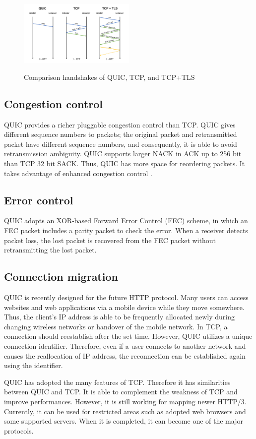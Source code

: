 \begin{figure}[!ht]
	\centering
	\includegraphics[width=0.5\textwidth]{images/fig_2_4.pdf}\\
	\caption{Comparison handshakes of QUIC, TCP, and TCP+TLS}
	\label{fig:RTT}
\end{figure}

\subsection{Congestion control}

QUIC provides a richer pluggable congestion control than TCP. QUIC gives different sequence numbers to packets; the original packet and retransmitted packet have different sequence numbers, and consequently, it is able to avoid retransmission ambiguity. QUIC supports larger NACK in ACK up to 256 bit than TCP 32 bit SACK. Thus, QUIC has more space for reordering packets. It takes advantage of enhanced congestion control \cite{drafttsvwgquicprotocol02}\cite{nalawade2018comparison}.

\subsection{Error control}

QUIC adopts an XOR-based Forward Error Control (FEC) scheme, in which an FEC packet includes a parity packet to check the error. When a receiver detects packet loss, the lost packet is recovered from the FEC packet without retransmitting the lost packet.

\subsection{Connection migration}

QUIC is recently designed for the future HTTP protocol. Many users can access websites and web applications via a mobile device while they move somewhere. Thus, the client’s IP address is able to be frequently allocated newly during changing wireless networks or handover of the mobile network. In TCP, a connection should reestablish after the set time. However, QUIC utilizes a unique connection identifier. Therefore, even if a user connects to another network and causes the reallocation of IP address, the reconnection can be established again using the identifier.

QUIC has adopted the many features of TCP. Therefore it has similarities between QUIC and TCP. It is able to complement the weakness of TCP and improve performances. However, it is still working for mapping newer HTTP/3. Currently, it can be used for restricted areas such as adopted web browsers and some supported servers. When it is completed, it can become one of the major protocols.

